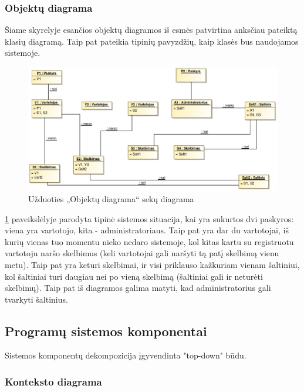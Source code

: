 \documentclass[12pt]{article}
\begin{document}
	\subsubsection{Objektų diagrama}
	
	Šiame skyrelyje esančios objektų diagramos iš esmės patvirtina anksčiau pateiktą klasių diagramą. Taip pat pateikia tipinių pavyzdžių, kaip klasės bus naudojamos sistemoje.
	
	\begin{figure}[h]
		\begin{center}
			\includegraphics[width=\textwidth]{ObjektuDiagrama.eps}
			\caption{Užduoties „Objektų diagrama“ sekų diagrama\label{ObjectDiagram}}
		\end{center}
	\end{figure}
	
	\ref{ObjectDiagram} paveikslėlyje parodyta tipinė sistemos situacija, kai yra sukurtos dvi paskyros: viena yra vartotojo, kita - administratoriaus. Taip pat yra dar du vartotojai, iš kurių vienas tuo momentu nieko nedaro sistemoje, kol kitas kartu su registruotu vartotoju naršo skelbimus (keli vartotojai gali naršyti tą patį skelbimą vienu metu). Taip pat yra keturi skelbimai, ir visi priklauso kažkuriam vienam šaltiniui, kol šaltiniai turi daugiau nei po vieną skelbimą (šaltiniai gali ir neturėti skelbimų). Taip pat iš diagramos galima matyti, kad administratorius gali tvarkyti šaltinius.
	\pagebreak
	
	\subsection{Programų sistemos komponentai}
	
	Sistemos komponentų dekompozicija įgyvendinta "top-down" būdu.	
	
	\subsubsection{Konteksto diagrama}
	
\end{document}
